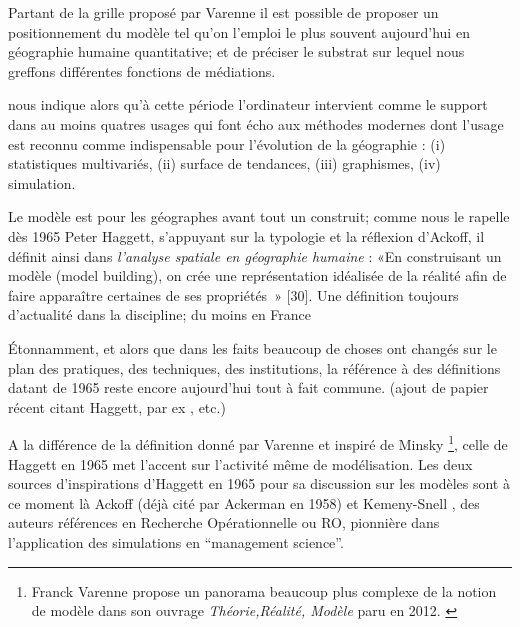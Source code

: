 Partant de la grille proposé par Varenne \autocite{Varenne2013} il est possible de proposer un positionnement du modèle tel qu'on l'emploi le plus souvent aujourd'hui en géographie humaine quantitative; et de préciser le substrat sur lequel nous greffons différentes fonctions de médiations.

\textcite{Haggett1969} nous indique alors qu'à cette période l'ordinateur intervient comme le support dans au moins quatres usages qui font écho aux méthodes modernes dont l'usage est reconnu comme indispensable \textcite{Claval1977} pour l'évolution  de la géographie : (i) statistiques multivariés, (ii) surface de tendances, (iii) graphismes, (iv) simulation. 

Le modèle est pour les géographes avant tout un construit; comme nous le rapelle dès 1965 Peter Haggett, s'appuyant sur la typologie et la réflexion d'Ackoff, il définit ainsi dans \textit{l'analyse spatiale en géographie humaine} : «En construisant un modèle (model building), on crée une représentation idéalisée de la réalité afin de faire apparaître certaines de ses propriétés » [30]\autocite{Haggett1965}. Une définition toujours d'actualité dans la discipline; du moins en France \autocite{Brunet2000} \autocite[295]{Bailly1995} \autocite{Dastes2001}

Étonnamment, et alors que dans les faits beaucoup de choses ont changés sur le plan des pratiques, des techniques, des institutions, la référence à des définitions datant de 1965 reste encore aujourd'hui tout à fait commune. (ajout de papier récent citant Haggett, par ex \autocite{Antony2013}, \autocite{Dastes2001} etc.)

A la différence de la définition donné par Varenne et inspiré de Minsky \footnote{Franck Varenne propose un panorama beaucoup plus complexe de la notion de modèle dans son ouvrage \textit{Théorie,Réalité, Modèle} paru en 2012. \autocite{Varenne2012}}, celle de Haggett en 1965 met l'accent sur l'activité même de modélisation. Les deux sources d'inspirations d'Haggett \autocite[106]{Berry1963} en 1965 pour sa discussion sur les modèles sont à ce moment là Ackoff \autocite{Ackoff1962} (déjà cité par Ackerman en 1958) et Kemeny-Snell \autocite{Kemeny1962}, des auteurs références en Recherche Opérationnelle ou RO, pionnière dans l'application des simulations en \enquote{management science}.
 


